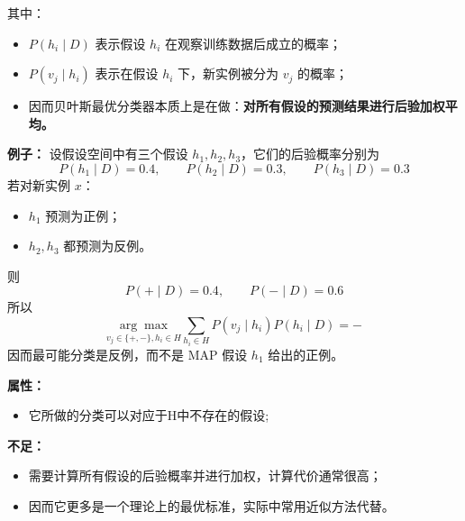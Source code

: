 \documentclass[../main.tex]{subfiles}
\begin{document}
\begin{enumerate}
    其中：
    \begin{itemize}
        \item $P(h_i\mid D)$ 表示假设 $h_i$ 在观察训练数据后成立的概率；
        \item $P(v_j\mid h_i)$ 表示在假设 $h_i$ 下，新实例被分为 $v_j$ 的概率；
        \item 因而贝叶斯最优分类器本质上是在做：\textbf{对所有假设的预测结果进行后验加权平均。}
    \end{itemize}
    {\small\kaishu
    \item \textbf{例子：}
    设假设空间中有三个假设 $h_1,h_2,h_3$，它们的后验概率分别为
    \[
    P(h_1\mid D)=0.4,\qquad P(h_2\mid D)=0.3,\qquad P(h_3\mid D)=0.3
    \]
    若对新实例 $x$：
    \begin{itemize}
        \item $h_1$ 预测为正例；
        \item $h_2,h_3$ 都预测为反例。
    \end{itemize}
    则
    \[
    P(+\mid D)=0.4,\qquad P(-\mid D)=0.6
    \]
    所以
    \[ \underset{{v}_{j} \in  \{ +, - \} ,{h}_{i} \in  H}{\arg \max }\mathop{\sum }\limits_{{{h}_{i} \in  H}}P\left( {{v}_{j} \mid  {h}_{i}}\right) P\left( {{h}_{i} \mid  D}\right)  =  - \]
    因而最可能分类是反例，而不是 MAP 假设 $h_1$ 给出的正例。  
    }
    \item \textbf{属性：}
    \begin{itemize}
        \item 它所做的分类可以对应于H中不存在的假设;
    \end{itemize}
    \item \textbf{不足：}
    \begin{itemize}
        \item 需要计算所有假设的后验概率并进行加权，计算代价通常很高；
        \item 因而它更多是一个理论上的最优标准，实际中常用近似方法代替。
    \end{itemize}
\end{enumerate}
\end{document}
